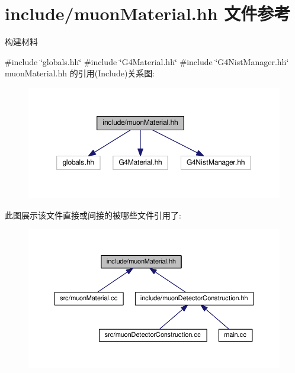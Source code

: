 \hypertarget{muonMaterial_8hh}{}\section{include/muon\+Material.hh 文件参考}
\label{muonMaterial_8hh}


构建材料  


{\ttfamily \#include \char`\"{}globals.\+hh\char`\"{}}\newline
{\ttfamily \#include \char`\"{}G4\+Material.\+hh\char`\"{}}\newline
{\ttfamily \#include \char`\"{}G4\+Nist\+Manager.\+hh\char`\"{}}\newline
muon\+Material.\+hh 的引用(Include)关系图\+:\nopagebreak
\begin{figure}[H]
\begin{center}
\leavevmode
\includegraphics[width=350pt]{muonMaterial_8hh__incl}
\end{center}
\end{figure}
此图展示该文件直接或间接的被哪些文件引用了\+:\nopagebreak
\begin{figure}[H]
\begin{center}
\leavevmode
\includegraphics[width=350pt]{muonMaterial_8hh__dep__incl}
\end{center}
\end{figure}
